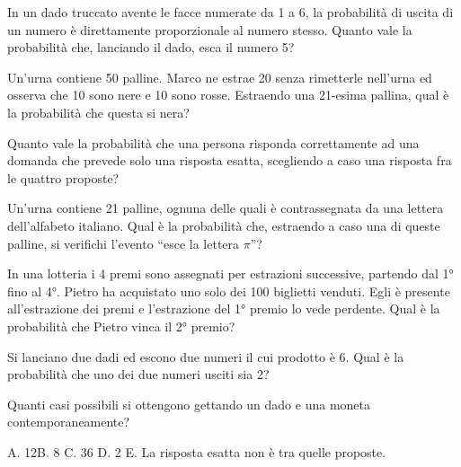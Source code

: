 \begin{esercizio} %
In un dado truccato avente le facce numerate da 1 a 6, la probabilità di uscita 
di un numero è direttamente proporzionale al numero stesso. Quanto vale la 
probabilità che, lanciando il dado, esca il numero 5?
\end{esercizio}

\begin{esercizio} %
Un'urna contiene 50 palline. Marco ne estrae 20 senza rimetterle nell'urna ed 
osserva che 10 sono nere e 10 sono rosse. Estraendo una 21-esima pallina, qual è 
la probabilità che questa si nera?
\end{esercizio}

\begin{esercizio} %
Quanto vale la probabilità che una persona risponda correttamente ad una domanda 
che prevede solo una risposta esatta, scegliendo a caso una risposta fra le 
quattro proposte?
\end{esercizio}

\begin{esercizio} %
Un'urna contiene 21 palline, ognuna delle quali è contrassegnata da una lettera 
dell'alfabeto italiano. Qual è la probabilità che, estraendo a caso una di 
queste palline, si verifichi l'evento ``esce la lettera $ \pi $''?
\end{esercizio}

\begin{esercizio} %
In una lotteria i 4 premi sono assegnati per estrazioni successive, partendo dal 
1° fino al 4°. Pietro ha acquistato uno solo dei 100 biglietti venduti. Egli è 
presente all'estrazione dei premi e l'estrazione del 1° premio lo vede perdente. 
Qual è la probabilità che Pietro vinca il 2° premio?
\end{esercizio}

\begin{esercizio} %
Si lanciano due dadi ed escono due numeri il cui prodotto è 6. Qual è la 
probabilità che uno dei due numeri usciti sia 2?
\end{esercizio}

\begin{esercizio} %
Quanti casi possibili si ottengono gettando un dado e una moneta 
contemporaneamente?

A. 12\quad B. 8 \quad C. 36 \quad D. 2 \quad E. La risposta esatta non è tra 
quelle proposte.
\end{esercizio}

